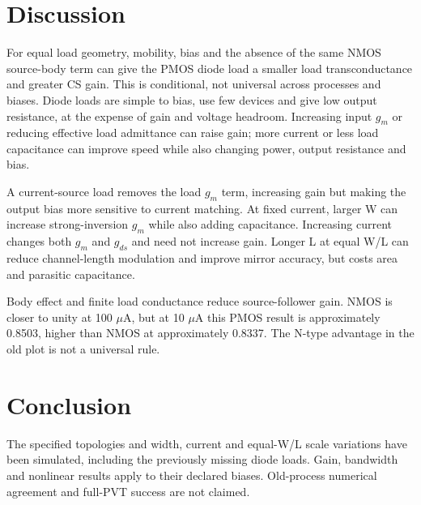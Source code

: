 \section{Discussion}
For equal load geometry, mobility, bias and the absence of the same NMOS source-body term can give the PMOS diode load a smaller load transconductance and greater CS gain. This is conditional, not universal across processes and biases. Diode loads are simple to bias, use few devices and give low output resistance, at the expense of gain and voltage headroom. Increasing input $g_m$ or reducing effective load admittance can raise gain; more current or less load capacitance can improve speed while also changing power, output resistance and bias.

A current-source load removes the load $g_m$ term, increasing gain but making the output bias more sensitive to current matching. At fixed current, larger W can increase strong-inversion $g_m$ while also adding capacitance. Increasing current changes both $g_m$ and $g_{ds}$ and need not increase gain. Longer L at equal W/L can reduce channel-length modulation and improve mirror accuracy, but costs area and parasitic capacitance.

Body effect and finite load conductance reduce source-follower gain. NMOS is closer to unity at 100 $\mu$A, but at 10 $\mu$A this PMOS result is approximately 0.8503, higher than NMOS at approximately 0.8337. The N-type advantage in the old plot is not a universal rule.

\section{Conclusion}
The specified topologies and width, current and equal-W/L scale variations have been simulated, including the previously missing diode loads. Gain, bandwidth and nonlinear results apply to their declared biases. Old-process numerical agreement and full-PVT success are not claimed.

